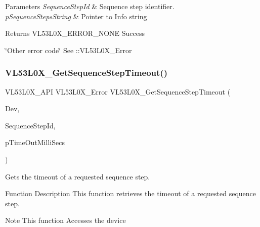 \begin{DoxyParams}{Parameters}
{\em Sequence\+Step\+Id} & Sequence step identifier. \\
\hline
{\em p\+Sequence\+Steps\+String} & Pointer to Info string\\
\hline
\end{DoxyParams}
\begin{DoxyReturn}{Returns}
V\+L53\+L0\+X\+\_\+\+E\+R\+R\+O\+R\+\_\+\+N\+O\+NE Success 

\char`\"{}\+Other error code\char`\"{} See \+::\+V\+L53\+L0\+X\+\_\+\+Error 
\end{DoxyReturn}
\mbox{\label{group__VL53L0X__parameters__group_gacac67612ceb128355f2bc7a4354a049f}} 
\subsubsection{\texorpdfstring{V\+L53\+L0\+X\+\_\+\+Get\+Sequence\+Step\+Timeout()}{VL53L0X\_GetSequenceStepTimeout()}}
{\footnotesize\ttfamily V\+L53\+L0\+X\+\_\+\+A\+PI V\+L53\+L0\+X\+\_\+\+Error V\+L53\+L0\+X\+\_\+\+Get\+Sequence\+Step\+Timeout (\begin{DoxyParamCaption}\item[{\hyperlink{group__VL53L0X__platform__group_ga2d6405308b1dd524b462f1b8fb97d167}{V\+L53\+L0\+X\+\_\+\+D\+EV}}]{Dev,  }\item[{V\+L53\+L0\+X\+\_\+\+Sequence\+Step\+Id}]{Sequence\+Step\+Id,  }\item[{\hyperlink{vl53l0x__types_8h_afb910790161809fc76e1a274a6349384}{Fix\+Point1616\+\_\+t} $\ast$}]{p\+Time\+Out\+Milli\+Secs }\end{DoxyParamCaption})}



Gets the timeout of a requested sequence step. 

\begin{DoxyParagraph}{Function Description}
This function retrieves the timeout of a requested sequence step.
\end{DoxyParagraph}
\begin{DoxyNote}{Note}
This function Accesses the device
\end{DoxyNote}

